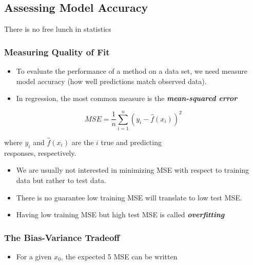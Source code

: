 \documentclass[11pt]{article}
\providecommand{\tightlist}{%
      \setlength{\itemsep}{0pt}\setlength{\parskip}{0pt}}
\begin{document}
    \hypertarget{assessing-model-accuracy}{%
\subsection{Assessing Model Accuracy}\label{assessing-model-accuracy}}

    There is no free lunch in statistics

    \hypertarget{measuring-quality-of-fit}{%
\subsubsection{Measuring Quality of
Fit}\label{measuring-quality-of-fit}}

    \begin{itemize}
\item
  To evaluate the performance of a method on a data set, we need measure
  model accuracy (how well predictions match observed data).
\item
  In regression, the most common measure is the
  \textbf{\emph{mean-squared error}}
\end{itemize}

\[MSE = \frac{1}{n}\sum_{i=1}^n (y_i - \hat{f}(x_i))^2\]

where \(y_i\) and \(\hat{f}(x_i)\) are the \(i\) true and predicting\\
responses, respectively.

\begin{itemize}
\item
  We are usually not interested in minimizing MSE with respect to
  training data but rather to test data.
\item
  There is no guarantee low training MSE will translate to low test MSE.
\item
  Having low training MSE but high test MSE is called
  \textbf{\emph{overfitting}}
\end{itemize}

    \hypertarget{the-bias-variance-tradeoff}{%
\subsubsection{The Bias-Variance
Tradeoff}\label{the-bias-variance-tradeoff}}

    \begin{itemize}
\tightlist
\item
  For a given \(x_0\), the expected 5 MSE can be written
\end{itemize}
\end{document}
